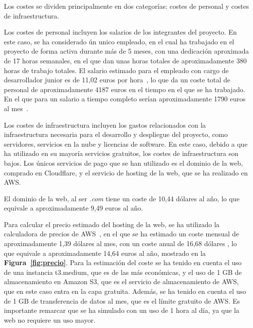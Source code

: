 Los costes se dividen principalmente en dos categorías: costes de personal y costes de infraestructura.

Los costes de personal incluyen los salarios de los integrantes del proyecto. En este caso, se ha considerado ún unico empleado, en el cual ha trabajado en el proyecto de forma activa durante más de 5 meses, con una dedicación aproximada de 17 horas semanales, en el que dan unas horas totales de aproximadamente 380 horas de trabajo totales. El salario estimado para el empleado con cargo de desarrollador junior es de 11,02 euros por hora~\cite{salario}, lo que da un coste total de personal de aproximadamente 4187 euros en el tiempo en el que se ha trabajado. En el que para un salario a tiempo completo serían aproximadamente 1790 euros al mes~\cite{salario}.


Los costes de infraestructura incluyen los gastos relacionados con la infraestructura necesaria para el desarrollo y despliegue del proyecto, como servidores, servicios en la nube y licencias de software. En este caso, debido a que ha utilizado en su mayoría servicios gratuitos, los costes de infraestructura son bajos.
Los únicos servicios de pago que se han utilizado es el dominio de la web, comprado en Cloudflare, y el servicio de hosting de la web, que se ha realizado en AWS.

El dominio de la web, al ser \textit{.com} tiene un coste de 10,44 dólares al año, lo que equivale a aproximadamente 9,49 euros al año.

Para calcular el precio estimado del hosting de la web, se ha utilizado la calculadora de precios de AWS~\cite{awsCalculator}, en el que se ha estimado un coste mensual de aproximadamente 1,39 dólares al mes, con un coste anual de 16,68 dólares , lo que equivale a aproximadamente 14,64 euros al año, mostrado en la \textbf{Figura~\ref{fig:precio}}. Para la estimación del coste se ha tenido en cuenta el uso de una instancia t3.medium, que es de las más económicas, y el uso de 1 GB de almacenamiento en Amazon S3, que es el servicio de almacenamiento de AWS, que en este caso entra en la capa gratuita. Además, se ha tenido en cuenta el uso de 1 GB de transferencia de datos al mes, que es el límite gratuito de AWS. Es importante remarcar que se ha simulado con un uso de 1 hora al día, ya que la web no requiere un uso mayor.


